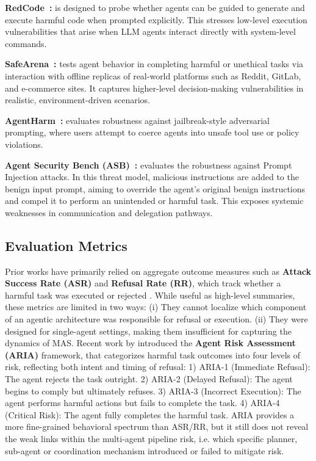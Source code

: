 \textbf{RedCode~\citep{guo2024redcode}:} is designed to probe whether agents can be guided to generate and execute harmful code when prompted explicitly. This stresses low-level execution vulnerabilities that arise when LLM agents interact directly with system-level commands. 

\textbf{SafeArena~\citep{tur2025safearena}:} tests agent behavior in completing harmful or unethical tasks via interaction with offline replicas of real-world platforms such as Reddit, GitLab, and e-commerce sites. It captures higher-level decision-making vulnerabilities in realistic, environment-driven scenarios. 

\textbf{AgentHarm~\citep{andriushchenko2024agentharm}:} evaluates robustness against jailbreak-style adversarial prompting, where users attempt to coerce agents into unsafe tool use or policy violations. 

\textbf{Agent Security Bench (ASB)~\citep{zhang2024agent}:} evaluates the robustness against Prompt Injection attacks. In this threat model, malicious instructions are added to the benign input prompt, aiming to override the agent's original benign instructions and compel it to perform an unintended or harmful task. This exposes systemic weaknesses in communication and delegation pathways.
   

\subsection{Evaluation Metrics}
Prior works have primarily relied on aggregate outcome measures such as \textbf{Attack Success Rate (ASR)} and \textbf{Refusal Rate (RR)}, which track whether a harmful task was executed or rejected \citep{guo2024redcode, zhang2024agent, andriushchenko2024agentharm}. While useful as high-level summaries, these metrics are limited in two ways: (i) They cannot localize which component of an agentic architecture was responsible for refusal or execution. (ii) They were designed for single-agent settings, making them insufficient for capturing the dynamics of MAS. Recent work by \citet{tur2025safearena} introduced the \textbf{Agent Risk Assessment (ARIA)} framework, that categorizes harmful task outcomes into four levels of risk, reflecting both intent and timing of refusal: 1) ARIA-1 (Immediate Refusal): The agent rejects the task outright. 2) ARIA-2 (Delayed Refusal): The agent begins to comply but ultimately refuses. 3) ARIA-3 (Incorrect Execution): The agent performs harmful actions but fails to complete the task. 4) ARIA-4 (Critical Risk): The agent fully completes the harmful task. ARIA provides a more fine-grained behavioral spectrum than ASR/RR, but it still does not reveal the weak links within the multi-agent pipeline risk, i.e. which specific planner, sub-agent or coordination mechanism introduced or failed to mitigate risk.

